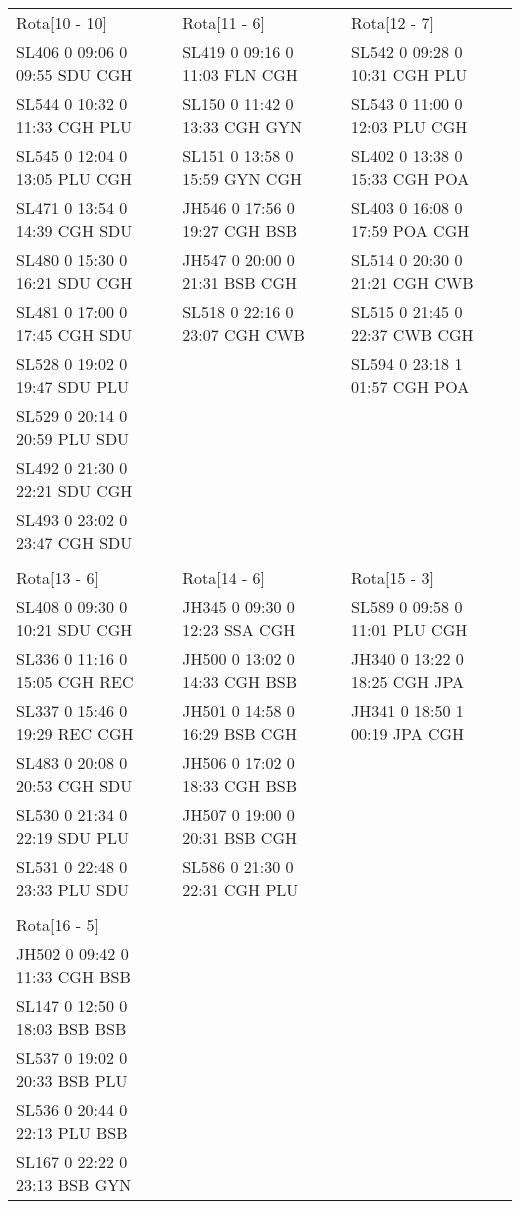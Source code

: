 \begin{scriptsize}
\begin{longtable}{l l l}
Rota[10 - 10]  & Rota[11 - 6]  & Rota[12 - 7] \\
SL406  0 09:06 0 09:55 SDU CGH & SL419  0 09:16 0 11:03 FLN CGH & SL542  0 09:28 0 10:31 CGH PLU\\
SL544  0 10:32 0 11:33 CGH PLU & SL150  0 11:42 0 13:33 CGH GYN & SL543  0 11:00 0 12:03 PLU CGH\\
SL545  0 12:04 0 13:05 PLU CGH & SL151  0 13:58 0 15:59 GYN CGH & SL402  0 13:38 0 15:33 CGH POA\\
SL471  0 13:54 0 14:39 CGH SDU & JH546  0 17:56 0 19:27 CGH BSB & SL403  0 16:08 0 17:59 POA CGH\\
SL480  0 15:30 0 16:21 SDU CGH & JH547  0 20:00 0 21:31 BSB CGH & SL514  0 20:30 0 21:21 CGH CWB\\
SL481  0 17:00 0 17:45 CGH SDU & SL518  0 22:16 0 23:07 CGH CWB & SL515  0 21:45 0 22:37 CWB CGH\\
SL528  0 19:02 0 19:47 SDU PLU & & SL594  0 23:18 1 01:57 CGH POA\\
SL529  0 20:14 0 20:59 PLU SDU\\
SL492  0 21:30 0 22:21 SDU CGH\\
SL493  0 23:02 0 23:47 CGH SDU\\

\\

Rota[13 - 6]  & Rota[14 - 6]  & Rota[15 - 3] \\
SL408  0 09:30 0 10:21 SDU CGH & JH345  0 09:30 0 12:23 SSA CGH & SL589  0 09:58 0 11:01 PLU CGH\\
SL336  0 11:16 0 15:05 CGH REC & JH500  0 13:02 0 14:33 CGH BSB & JH340  0 13:22 0 18:25 CGH JPA\\
SL337  0 15:46 0 19:29 REC CGH & JH501  0 14:58 0 16:29 BSB CGH & JH341  0 18:50 1 00:19 JPA CGH\\
SL483  0 20:08 0 20:53 CGH SDU & JH506  0 17:02 0 18:33 CGH BSB\\
SL530  0 21:34 0 22:19 SDU PLU & JH507  0 19:00 0 20:31 BSB CGH\\
SL531  0 22:48 0 23:33 PLU SDU & SL586  0 21:30 0 22:31 CGH PLU\\

\\

Rota[16 - 5]  &   &  \\
JH502 0 09:42 0 11:33 CGH BSB & & \\
SL147 0 12:50 0 18:03 BSB BSB & & \\
SL537 0 19:02 0 20:33 BSB PLU & & \\
SL536 0 20:44 0 22:13 PLU BSB & & \\
SL167 0 22:22 0 23:13 BSB GYN & & \\






\end{longtable}

\end{scriptsize}